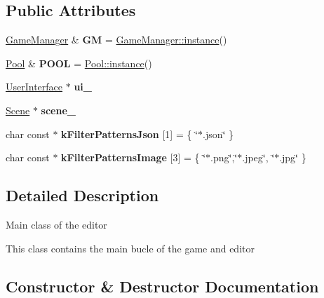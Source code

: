 \subsection*{Public Attributes}
\begin{DoxyCompactItemize}
\item 
\mbox{\label{class_game_abdaa5299f22a22a628149cda5040c5c8}} 
\hyperlink{class_game_manager}{Game\+Manager} \& {\bfseries GM} = \hyperlink{class_game_manager_afa37ab23c040b5225d567d4c9ab854e1}{Game\+Manager\+::instance}()
\item 
\mbox{\label{class_game_aa22c10008978460e1dea4d6fbfa70b53}} 
\hyperlink{class_pool}{Pool} \& {\bfseries P\+O\+OL} = \hyperlink{class_pool_a20e44e0054d4eedf57f1943b87c06e20}{Pool\+::instance}()
\item 
\mbox{\label{class_game_a8420709ece17e71164fb90f11a40a408}} 
\hyperlink{class_user_interface}{User\+Interface} $\ast$ {\bfseries ui\+\_\+}
\item 
\mbox{\label{class_game_af56b14716ecb1537c6fa626d66aa99f1}} 
\hyperlink{class_scene}{Scene} $\ast$ {\bfseries scene\+\_\+}
\item 
\mbox{\label{class_game_acd6e7363beb1cdf8a208f07ec41f39ae}} 
char const  $\ast$ {\bfseries k\+Filter\+Patterns\+Json} \mbox{[}1\mbox{]} = \{ \char`\"{}$\ast$.json\char`\"{} \}
\item 
\mbox{\label{class_game_a6abb1fb644b47a9ad92cad622b1b7222}} 
char const  $\ast$ {\bfseries k\+Filter\+Patterns\+Image} \mbox{[}3\mbox{]} = \{ \char`\"{}$\ast$.png\char`\"{},\char`\"{}$\ast$.jpeg\char`\"{}, \char`\"{}$\ast$.jpg\char`\"{} \}
\end{DoxyCompactItemize}


\subsection{Detailed Description}
Main class of the editor

This class contains the main bucle of the game and editor 

\subsection{Constructor \& Destructor Documentation}
\mbox{\label{class_game_ad59df6562a58a614fda24622d3715b65}} 
